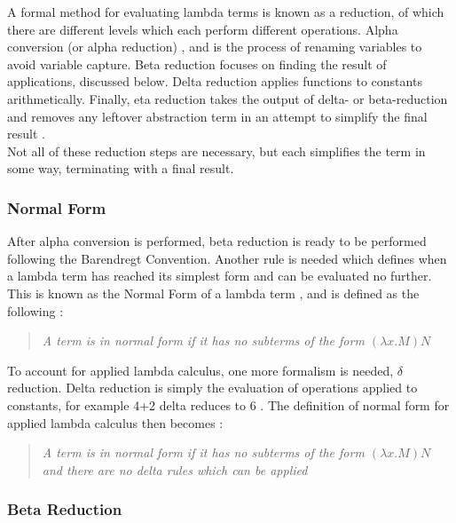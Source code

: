 \documentclass[a4paper,12pt]{report}
\begin{document}
A formal method for evaluating lambda terms is known as a reduction, of which there are different levels which each perform different operations. Alpha conversion (or alpha reduction) \cite{Horowitz2013}, and is the process of renaming variables to avoid variable capture. Beta reduction focuses on finding the result of applications, discussed below. Delta reduction applies functions to constants arithmetically. Finally, eta reduction takes the output of delta- or beta-reduction and removes any leftover abstraction term in an attempt to simplify the final result \cite{Sookocheff2018Eta}.\\

Not all of these reduction steps are necessary, but each simplifies the term in some way, terminating with a final result.

\subsubsection{Normal Form}

After alpha conversion is performed, beta reduction is ready to be performed following the Barendregt Convention. Another rule is needed which defines when a lambda term has reached its simplest form and can be evaluated no further. This is known as the Normal Form of a lambda term \cite{Barendregt2000}, and is defined as the following \cite{Hankin2004}:

\begin{quote}
	\centering
	\textit{A term is in normal form if it has no subterms of the form $(\lambda x.M)N$}
\end{quote}

To account for applied lambda calculus, one more formalism is needed, $\delta$ reduction. Delta reduction is simply the evaluation of operations applied to constants, for example 4+2 delta reduces to 6 \cite{Slonneger1995} \cite{Scott2016}. The definition of normal form for applied lambda calculus then becomes \cite{Hankin2004} \cite{Slonneger1995}:

\begin{quote}
	\centering
	\textit{A term is in normal form if it has no subterms of the form $(\lambda x.M)N$ and there are no delta rules which can be applied}
\end{quote}

\subsubsection{Beta Reduction}
\end{document}
